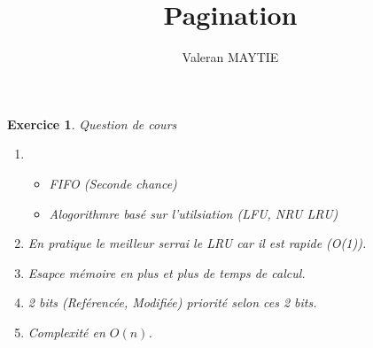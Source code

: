 \documentclass{article}
\title{\textbf{Pagination}}
\date{}
\author{Valeran MAYTIE}
\theoremstyle{plain}
\newtheorem{exo}{Exercice}%
\begin{document}
\maketitle

\begin{exo} Question de cours
\begin{enumerate}
    \item \begin{itemize}
        \item FIFO (Seconde chance)
        \item Alogorithmre basé sur l'utilsiation (LFU, NRU LRU)
    \end{itemize}

    \item En pratique le meilleur serrai le LRU car il est rapide (O(1)).
    \item Esapce mémoire en plus et plus de temps de calcul.
    \item 2 bits (Reférencée, Modifiée) priorité selon ces 2 bits.
    \item Complexité en $O(n)$.
\end{enumerate}
\end{exo}
\end{document}

